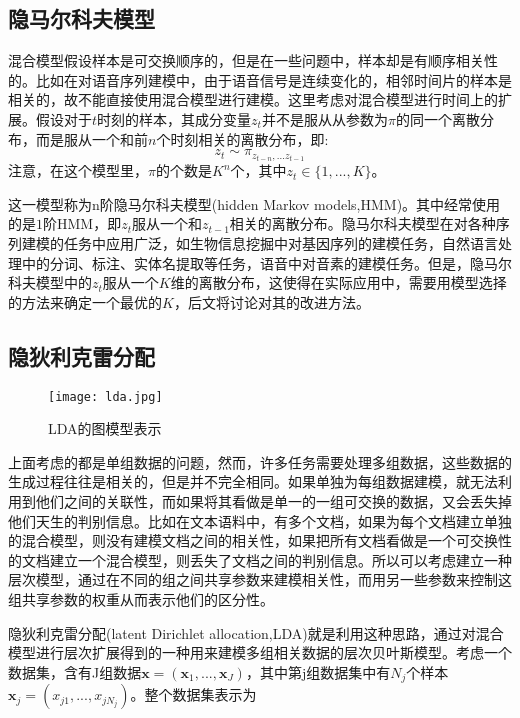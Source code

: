 \subsection{隐马尔科夫模型}\label{subsec:hmm}
混合模型假设样本是可交换顺序的，但是在一些问题中，样本却是有顺序相关性的。比如在对语音序列建模中，由于语音信号是连续变化的，相邻时间片的样本是相关的，故不能直接使用混合模型进行建模。这里考虑对混合模型进行时间上的扩展。假设对于$t$时刻的样本，其成分变量$z_t$并不是服从从参数为$\pi$的同一个离散分布，而是服从一个和前$n$个时刻相关的离散分布，即:
\begin{equation}
z_t \sim \pi_{z_{t-n},...z_{t-1}}
\end{equation}
注意，在这个模型里，$\pi$的个数是$K^n$个，其中$z_t \in \{1,...,K\}$。

这一模型称为n阶隐马尔科夫模型(hidden Markov models,HMM)\cite{rabiner1989tutorial}。其中经常使用的是$1$阶HMM，即$z_t$服从一个和$z_{t-1}$相关的离散分布。隐马尔科夫模型在对各种序列建模的任务中应用广泛，如生物信息挖掘中对基因序列的建模任务\cite{haussler1996generalized}，自然语言处理中的分词、标注、实体名提取等任务\cite{zhou2002named}，语音中对音素的建模任务。但是，隐马尔科夫模型中的$z_t$服从一个$K$维的离散分布，这使得在实际应用中，需要用模型选择的方法来确定一个最优的$K$，后文将讨论对其的改进方法。

\subsection{隐狄利克雷分配}\label{subsec:lda}
\begin{figure}
\texttt{[image: lda.jpg]} 
\caption{LDA的图模型表示}\label{fig:lda}
\end{figure}
上面考虑的都是单组数据的问题，然而，许多任务需要处理多组数据，这些数据的生成过程往往是相关的，但是并不完全相同。如果单独为每组数据建模，就无法利用到他们之间的关联性，而如果将其看做是单一的一组可交换的数据，又会丢失掉他们天生的判别信息。比如在文本语料中，有多个文档，如果为每个文档建立单独的混合模型，则没有建模文档之间的相关性，如果把所有文档看做是一个可交换性的文档建立一个混合模型，则丢失了文档之间的判别信息。所以可以考虑建立一种层次模型，通过在不同的组之间共享参数来建模相关性，而用另一些参数来控制这组共享参数的权重从而表示他们的区分性。

隐狄利克雷分配(latent Dirichlet allocation,LDA)\cite{blei2003latent}就是利用这种思路，通过对混合模型进行层次扩展得到的一种用来建模多组相关数据的层次贝叶斯模型。考虑一个数据集，含有J组数据${\bm x} = ({\bm x}_1,...,{\bm x}_J)$，其中第j组数据集中有$N_j$个样本${\bm x}_j = (x_{j1},...,x_{jN_j})$。整个数据集表示为


